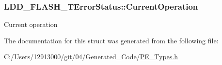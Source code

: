 \subsubsection[{Current\+Operation}]{ L\+D\+D\+\_\+\+F\+L\+A\+S\+H\+\_\+\+T\+Error\+Status\+::\+Current\+Operation}\label{struct_l_d_d___f_l_a_s_h___t_error_status_aa1b99bfba14fdc8379522df15da47e7b}
Current operation 

The documentation for this struct was generated from the following file\+:\begin{DoxyCompactItemize}
\item 
C\+:/\+Users/12913000/git/04/\+Generated\+\_\+\+Code/\hyperlink{_p_e___types_8h}{P\+E\+\_\+\+Types.\+h}\end{DoxyCompactItemize}
